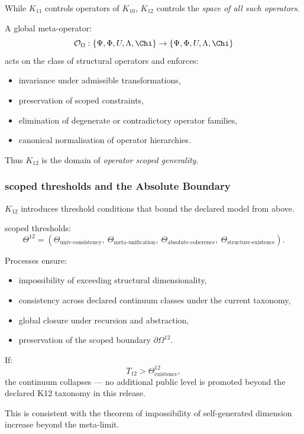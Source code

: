While $K_{11}$ controls operators of $K_{10}$,
$K_{12}$ controls the \emph{space of all such operators}.

A global meta-operator:
\[
\mathcal{O}_{\Omega} : \{\Psi, \Phi, U, \Lambda, \Chi\} \to 
            \{\Psi, \Phi, U, \Lambda, \Chi\}
\]
acts on the class of structural operators and enforces:
\begin{itemize}
    \item invariance under admissible transformations,
    \item preservation of scoped constraints,
    \item elimination of degenerate or contradictory operator families,
    \item canonical normalisation of operator hierarchies.
\end{itemize}

Thus $K_{12}$ is the domain of \emph{operator scoped generality}.

\subsubsection{scoped thresholds and the Absolute Boundary}

$K_{12}$ introduces threshold conditions that bound 
the declared model from above.

scoped thresholds:
\[
\Theta^{12} = 
(\Theta_{\text{univ-consistency}},\
 \Theta_{\text{meta-unification}},\
 \Theta_{\text{absolute-coherence}},\
 \Theta_{\text{structure-existence}}).
\]

Processes ensure:
\begin{itemize}
    \item impossibility of exceeding structural dimensionality,
    \item consistency across declared continuum classes under the current taxonomy,
    \item global closure under recursion and abstraction,
    \item preservation of the scoped boundary $\partial\Omega^{12}$.
\end{itemize}

If:
\[
T_{12} > \Theta^{12}_{\text{existence}},
\]
the continuum collapses --- no additional public level is promoted beyond the declared K12 taxonomy in this release.

This is consistent with the theorem of impossibility of 
self-generated dimension increase beyond the meta-limit.

